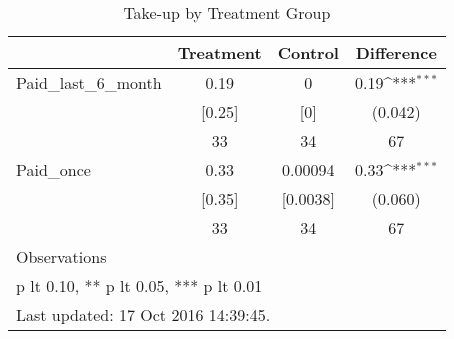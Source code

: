 \begin{table}[htbp]\centering
\def\sym#1{\ifmmode^{#1}\else\(^{#1}\)\fi}
\caption{Take-up by Treatment Group \label{tab:"balance"}}
\begin{tabular*}{0.9\hsize}{@{\hskip\tabcolsep\extracolsep\fill}l*{1}{ccc}}
\toprule
                                &Treatment&  Control&Difference         \\
\midrule
Paid\_last\_6\_month               &     0.19&        0&     0.19\sym{***}\\
                                &   [0.25]&      [0]&  (0.042)         \\
                                &       33&       34&       67         \\
Paid\_once                       &     0.33&  0.00094&     0.33\sym{***}\\
                                &   [0.35]& [0.0038]&  (0.060)         \\
                                &       33&       34&       67         \\
\midrule
Observations                    &         &         &                  \\
\bottomrule
\multicolumn{4}{l}{\footnotesize * p lt 0.10, ** p lt 0.05, *** p lt 0.01}\\
\multicolumn{4}{l}{\footnotesize Last updated: 17 Oct 2016 14:39:45.}\\
\end{tabular*}
\end{table}
